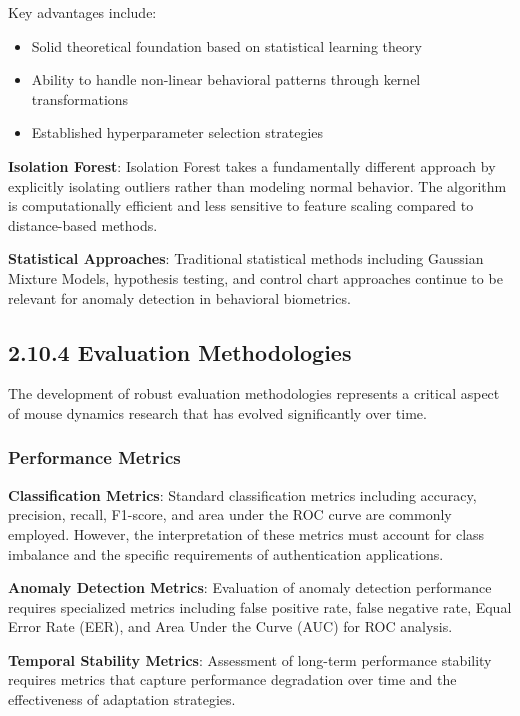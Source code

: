 \documentclass[
  12pt,
  a4paper,
]{report}
\providecommand{\tightlist}{%
  \setlength{\itemsep}{0pt}\setlength{\parskip}{0pt}}
\begin{document}
Key advantages include:

\begin{itemize}
\tightlist
\item
  Solid theoretical foundation based on statistical learning theory
\item
  Ability to handle non-linear behavioral patterns through kernel
  transformations
\item
  Established hyperparameter selection strategies
\end{itemize}

\textbf{Isolation Forest}: Isolation Forest takes a fundamentally
different approach by explicitly isolating outliers rather than modeling
normal behavior. The algorithm is computationally efficient and less
sensitive to feature scaling compared to distance-based methods.

\textbf{Statistical Approaches}: Traditional statistical methods
including Gaussian Mixture Models, hypothesis testing, and control chart
approaches continue to be relevant for anomaly detection in behavioral
biometrics.

\subsection{2.10.4 Evaluation
Methodologies}\label{evaluation-methodologies}

The development of robust evaluation methodologies represents a critical
aspect of mouse dynamics research that has evolved significantly over
time.

\subsubsection{Performance Metrics}\label{performance-metrics}

\textbf{Classification Metrics}: Standard classification metrics
including accuracy, precision, recall, F1-score, and area under the ROC
curve are commonly employed. However, the interpretation of these
metrics must account for class imbalance and the specific requirements
of authentication applications.

\textbf{Anomaly Detection Metrics}: Evaluation of anomaly detection
performance requires specialized metrics including false positive rate,
false negative rate, Equal Error Rate (EER), and Area Under the Curve
(AUC) for ROC analysis.

\textbf{Temporal Stability Metrics}: Assessment of long-term performance
stability requires metrics that capture performance degradation over
time and the effectiveness of adaptation strategies.
\end{document}
